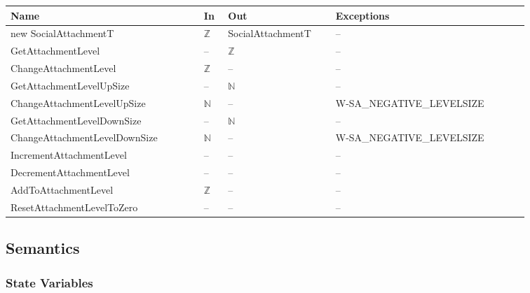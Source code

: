 \begin{center}
    \renewcommand{\arraystretch}{1.2}
    \begin{tabular}{m{0.32\linewidth} m{0.04\linewidth} m{0.175\linewidth}
            m{0.32\linewidth}}
        \toprule
        \textbf{Name} & \textbf{In} & \textbf{Out} & \textbf{Exceptions} \\
        \midrule

        \rowcolor[gray]{0.9}new SocialAttachmentT & $\mathbb{Z}$ &
        SocialAttachmentT & -- \\

        GetAttachmentLevel & -- & $\mathbb{Z}$ & -- \\

        \rowcolor[gray]{0.9}ChangeAttachmentLevel & $\mathbb{Z}$ & -- & -- \\

        GetAttachmentLevelUpSize & -- & $\mathbb{N}$ & -- \\

        \rowcolor[gray]{0.9}ChangeAttachmentLevelUpSize & $\mathbb{N}$ & -- &
        W-SA\_NEGATIVE\_LEVELSIZE \\

        GetAttachmentLevelDownSize & -- & $\mathbb{N}$ & -- \\

        \rowcolor[gray]{0.9}ChangeAttachmentLevelDownSize & $\mathbb{N}$ & -- &
        W-SA\_NEGATIVE\_LEVELSIZE \\

        IncrementAttachmentLevel & -- & -- & -- \\

        \rowcolor[gray]{0.9}DecrementAttachmentLevel & -- & -- & -- \\

        AddToAttachmentLevel & $\mathbb{Z}$ & -- & -- \\

        \rowcolor[gray]{0.9}ResetAttachmentLevelToZero & -- & -- & -- \\

        \bottomrule
    \end{tabular}
\end{center}

\subsection{Semantics}

\subsubsection{State Variables}

